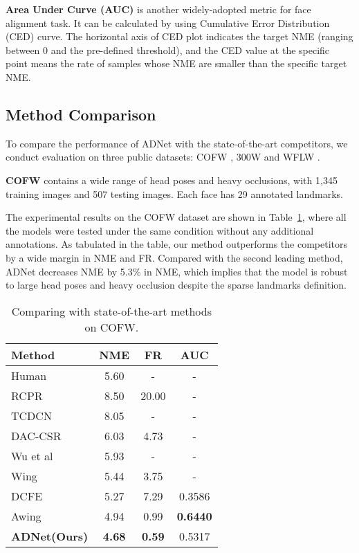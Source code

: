 \documentclass[10pt,twocolumn,letterpaper]{article}
\begin{document}
\vspace{5pt}
\noindent\textbf{Area Under Curve (AUC)} is another widely-adopted metric for face alignment task.
It can be calculated by using Cumulative Error Distribution (CED) curve.
The horizontal axis of CED plot indicates the target NME (ranging between 0 and the pre-defined threshold), and the CED value at the specific point means the rate of samples whose NME are smaller than the specific target NME.


\subsection{Method Comparison}
\label{subsection:method_comparison}

To compare the performance of ADNet with the state-of-the-art competitors, we conduct evaluation on three public datasets: COFW \cite{burgos2013robust}, 300W \cite{sagonas2013300} and WFLW \cite{wu2018look}.

\vspace{5pt}
\noindent\textbf{COFW} \cite{burgos2013robust} contains a wide range of head poses and heavy occlusions, with 1,345 training images and 507 testing images. Each face has 29 annotated landmarks. 

The experimental results on the COFW dataset are shown in Table~\ref{table:COFW}, where all the models were tested under the same condition without any additional annotations.
As tabulated in the table, our method outperforms the competitors by a wide margin in NME and FR.
Compared with the second leading method, ADNet decreases NME by 5.3\% in NME, which implies that the model is robust to large head poses and heavy occlusion despite the sparse landmarks definition.


\begin{table}
\begin{center}
\begin{tabular}{|l|c|c|c|}
\hline
Method & NME & FR & AUC \\
\hline
Human \cite{burgos2013robust} & 5.60 & - & - \\
RCPR \cite{burgos2013robust} & 8.50 & 20.00 & - \\
TCDCN \cite{zhang2014facial} & 8.05 & - & - \\
DAC-CSR \cite{feng2017dynamic} & 6.03 & 4.73 & - \\
Wu et al \cite{wu2015robust} & 5.93 & - & - \\
Wing \cite{feng2018wing} & 5.44 & 3.75 & - \\
DCFE \cite{valle2018deeply} & 5.27 & 7.29 & 0.3586 \\
Awing \cite{wang2019adaptive} & 4.94 & 0.99 & \textbf{0.6440} \\
\hline
\textbf{ADNet(Ours)} & \textbf{4.68} & \textbf{0.59} & 0.5317 \\
\hline
\end{tabular}
\end{center}
\caption{Comparing with state-of-the-art methods on COFW.}
\label{table:COFW}
\end{table}
\end{document}
